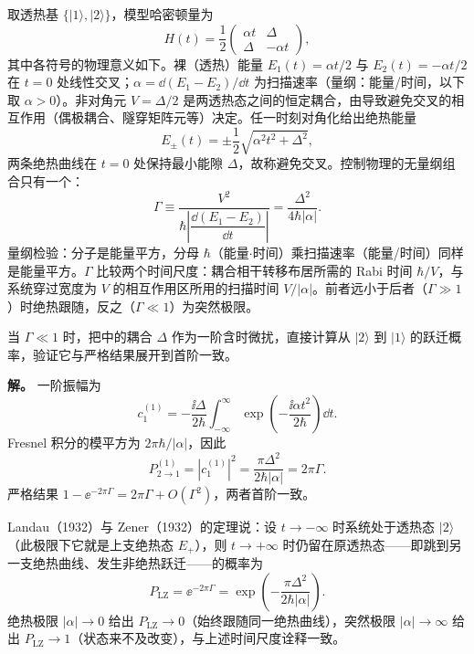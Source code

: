 取透热基 $\{|1\rangle,|2\rangle\}$，模型哈密顿量为
\begin{equation}
H(t)=\frac12\begin{pmatrix}\alpha t&\Delta\\\Delta&-\alpha t\end{pmatrix},
\label{eq:tdpt-lz-hamiltonian}
\end{equation}
其中各符号的物理意义如下。裸（透热）能量 $E_1(t)=\alpha t/2$ 与 $E_2(t)=-\alpha t/2$ 在 $t=0$ 处线性交叉；$\alpha=\dd(E_1-E_2)/\dd t$ 为扫描速率（量纲：能量/时间，以下取 $\alpha>0$）。非对角元 $V=\Delta/2$ 是两透热态之间的恒定耦合，由导致避免交叉的相互作用（偶极耦合、隧穿矩阵元等）决定。任一时刻对角化给出绝热能量
\begin{equation}
E_\pm(t)=\pm\frac12\sqrt{\alpha^2t^2+\Delta^2},
\label{eq:tdpt-lz-adiabatic}
\end{equation}
两条绝热曲线在 $t=0$ 处保持最小能隙 $\Delta$，故称避免交叉。控制物理的无量纲组合只有一个：
\begin{equation}
\Gamma\equiv\frac{V^{2}}{\hbar\left|\dfrac{\dd(E_1-E_2)}{\dd t}\right|}
=\frac{\Delta^{2}}{4\hbar|\alpha|}.
\label{eq:tdpt-lz-gamma}
\end{equation}
量纲检验：分子是能量平方，分母 $\hbar$（能量$\cdot$时间）乘扫描速率（能量/时间）同样是能量平方。$\Gamma$ 比较两个时间尺度：耦合相干转移布居所需的 Rabi 时间 $\hbar/V$，与系统穿过宽度为 $V$ 的相互作用区所用的扫描时间 $V/|\alpha|$。前者远小于后者（$\Gamma\gg1$）时绝热跟随，反之（$\Gamma\ll1$）为突然极限。


\par
\begin{workedexample}
当 $\Gamma\ll1$ 时，把中的耦合 $\Delta$ 作为一阶含时微扰，直接计算从 $|2\rangle$ 到 $|1\rangle$ 的跃迁概率，验证它与严格结果展开到首阶一致。

\textbf{解。} 一阶振幅为
\[
c_1^{(1)}=-\frac{\ii\Delta}{2\hbar}\int_{-\infty}^{\infty}\exp\!\left(-\frac{\ii\alpha t^2}{2\hbar}\right)\dd t.
\]
Fresnel 积分的模平方为 \(2\pi\hbar/|\alpha|\)，因此
\[
P_{2\to1}^{(1)}=|c_1^{(1)}|^2=\frac{\pi\Delta^2}{2\hbar|\alpha|}=2\pi\Gamma.
\]
严格结果 \(1-\ee^{-2\pi\Gamma}=2\pi\Gamma+O(\Gamma^2)\)，两者首阶一致。
\end{workedexample}
\par
Landau（1932）与 Zener（1932）的定理说：设 $t\to-\infty$ 时系统处于透热态 $|2\rangle$（此极限下它就是上支绝热态 $E_+$），则 $t\to+\infty$ 时仍留在原透热态——即跳到另一支绝热曲线、发生非绝热跃迁——的概率为
\begin{equation}
P_{\mathrm{LZ}}=\ee^{-2\pi\Gamma}
=\exp\!\left(-\frac{\pi\Delta^{2}}{2\hbar|\alpha|}\right).
\label{eq:tdpt-landau-zener}
\end{equation}
绝热极限 $|\alpha|\to0$ 给出 $P_{\mathrm{LZ}}\to0$（始终跟随同一绝热曲线），突然极限 $|\alpha|\to\infty$ 给出 $P_{\mathrm{LZ}}\to1$（状态来不及改变），与上述时间尺度诠释一致。

